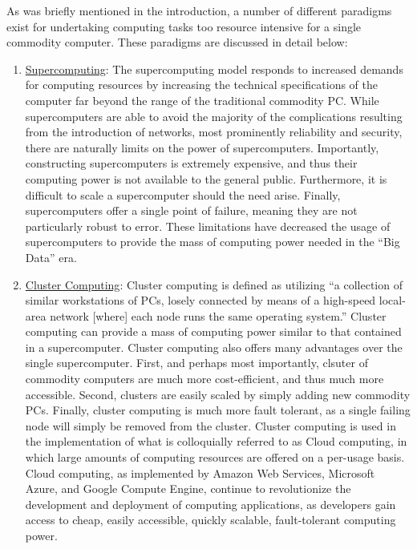 As was briefly mentioned in the introduction, a number of different paradigms
exist for undertaking computing tasks too resource intensive for a single
commodity computer. These paradigms are discussed in detail below:

\begin{enumerate}
  \item \underline{Supercomputing}: The supercomputing model responds to
    increased demands for computing resources by increasing the technical
    specifications of the computer far beyond the range of the
    traditional commodity PC.
    While supercomputers are able to avoid the majority of the complications
    resulting from the introduction of networks, most prominently reliability and
    security, there are naturally limits on the power of supercomputers.
    Importantly, constructing supercomputers is extremely expensive, and thus
    their computing power is not available to the general public. Furthermore,
    it is difficult to scale a supercomputer should the need arise. Finally,
    supercomputers offer a single point of failure, meaning they are not
    particularly robust to
    error.\cite{cluster-computing-the-commodity-supercomputer}
    These limitations have decreased the usage of
    supercomputers to provide the mass of computing power needed in the ``Big
    Data'' era.

  \item \underline{Cluster Computing}: Cluster computing is defined as utilizing
    ``a collection of similar workstations of PCs, losely connected by means of
    a high-speed local-area network [where] each node runs the same operating
    system.''\cite[pg. 17-18]{distributed-systems-principles-and-paradigms}
    Cluster computing can provide a mass of computing power similar to
    that contained in a supercomputer. Cluster computing also offers many
    advantages over the single supercomputer. First, and perhaps most
    importantly, clsuter of commodity computers are
    much more cost-efficient, and thus much more
    accessible. Second, clusters are easily scaled
    by simply adding new commodity PCs.
    Finally, cluster computing is much more fault
    tolerant, as a single failing node will simply be removed
    from the cluster.\cite{cluster-based-scalable-network-services}
    Cluster computing is used in the
    implementation of what is colloquially referred to as Cloud
    computing, in which large amounts of computing resources are offered on a
    per-usage basis.\cite[pg. 13]{distributed-systems-concepts-and-design}
    Cloud computing, as implemented by Amazon Web
    Services,\cite{amazon-web-services} Microsoft Azure,\cite{microsoft-azure}
    and Google Compute Engine,\cite{google-compute-engine} continue to
    revolutionize the development and deployment of computing applications, as
    developers gain access to cheap, easily accessible, quickly scalable,
    fault-tolerant computing power.


\end{enumerate}
